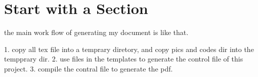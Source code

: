 
\section{Start with a Section}

the main work flow of generating my document is like that.

1. copy all tex file into a temprary diretory, and copy pics and codes dir into the tempprary dir.
2. use files in the templates to generate the control file of this project.
3. compile the contral file to generate the pdf.
